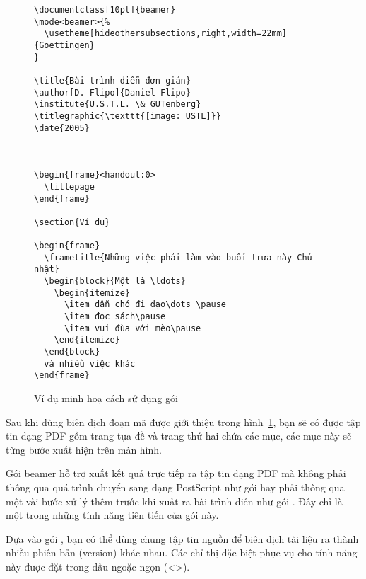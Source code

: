 \begin{figure}[htbp]
\begin{verbatim}
\documentclass[10pt]{beamer}
\mode<beamer>{%
  \usetheme[hideothersubsections,right,width=22mm]{Goettingen}
}

\title{Bài trình diễn đơn giản}
\author[D. Flipo]{Daniel Flipo}
\institute{U.S.T.L. \& GUTenberg}
\titlegraphic{\texttt{[image: USTL]}}
\date{2005}



\begin{frame}<handout:0>
  \titlepage
\end{frame}

\section{Ví dụ}

\begin{frame}
  \frametitle{Những việc phải làm vào buổi trưa này Chủ nhật}
  \begin{block}{Một là \ldots}
    \begin{itemize}
      \item dẫn chó đi dạo\dots \pause
      \item đọc sách\pause
      \item vui đùa với mèo\pause
    \end{itemize}
  \end{block}
  và nhiều việc khác
\end{frame}

\end{verbatim}
  \caption{Ví dụ minh hoạ cách sử dụng gói }
  \label{fig:code-beamer}
\end{figure}

Sau khi dùng  biên dịch đoạn mã được giới thiệu trong hình~\ref{fig:code-beamer}, bạn sẽ có được tập tin dạng PDF gồm trang tựa đề và trang thứ hai chứa các mục, các mục này sẽ từng bước xuất hiện trên màn hình.

Gói beamer hỗ trợ xuất kết quả trực tiếp ra tập tin dạng PDF mà không phải thông qua quá trình chuyển sang dạng PostScript như gói  hay phải thông qua một vài bước xử lý thêm trước khi xuất ra bài trình diễn như gói . Đây chỉ là một trong những tính năng tiên tiến của gói này.

Dựa vào gói , bạn có thể dùng chung tập tin nguồn để biên dịch tài liệu ra thành nhiều phiên bản (version) khác nhau. Các chỉ thị đặc biệt phục vụ cho tính năng này được đặt trong dấu ngoặc ngọn (<>).

